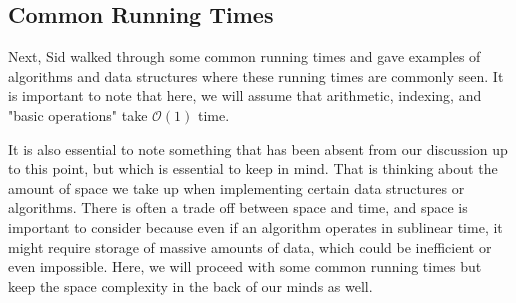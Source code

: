 \subsection{Common Running Times}
Next, Sid walked through some common running times and gave examples of algorithms and data structures where these running times are commonly seen. It is important to note that here, we will assume that arithmetic, indexing, and "basic operations" take $\mathcal{O}(1)$ time. 

It is also essential to note something that has been absent from our discussion up to this point, but which is essential to keep in mind. That is thinking about the amount of space we take up when implementing certain data structures or algorithms. There is often a trade off between space and time, and space is important to consider because even if an algorithm operates in sublinear time, it might require storage of massive amounts of data, which could be inefficient or even impossible. Here, we will proceed with some common running times but keep the space complexity in the back of our minds as well.

